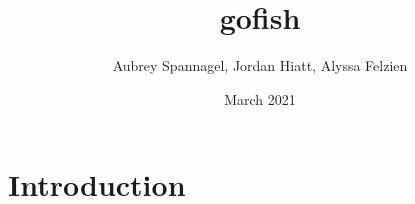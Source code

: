 \documentclass{article}
\title{gofish}
\author{Aubrey Spannagel, Jordan Hiatt, Alyssa Felzien }
\date{March 2021}
\begin{document}
\maketitle

\section{Introduction}
\end{document}
